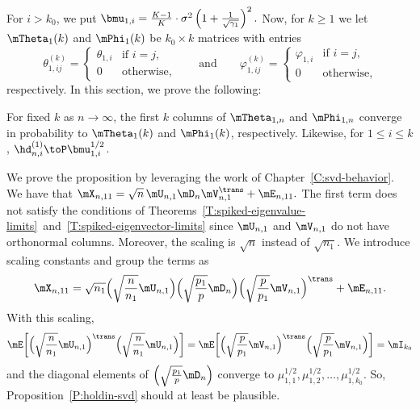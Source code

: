 For $i > k_0$, we put 
\(
    \bmu_{1,i} 
        =
            \frac{K-1}{K} 
            \cdot
            \sigma^2
            \left(
                1
                +
                \frac{1}{\sqrt{\gamma_1}}
            \right)^2.
\)
Now, for $k \geq 1$ we let $\mTheta_{1}(k)$ and $\mPhi_1(k)$ be $k_0 \times k$ matrices with entries
\[
    \theta_{1,ij}^{(k)}
        =
            \begin{cases}
                \theta_{1,i}&\text{if $i = j$,} \\
                0&\text{otherwise,}
            \end{cases}
    \qquad
    \text{and}
    \qquad
    \varphi_{1,ij}^{(k)}
        =
            \begin{cases}
                \varphi_{1,i}&\text{if $i = j$,} \\
                0&\text{otherwise,}
            \end{cases}
\]
respectively.  In this section, we prove the following:

\begin{proposition}\label{P:holdin-svd}
    For fixed $k$ as $n\to\infty$, the first $k$ columns of $\mTheta_{1,n}$
    and $\mPhi_{1,n}$ converge in probability to $\mTheta_{1}(k)$ and 
    $\mPhi_{1}(k)$, respectively.  Likewise, for $1 \leq i \leq k$,
    $\hd_{n,i}^{(1)} \toP \bmu_{1,i}^{1/2}$.
\end{proposition}

We prove the proposition by leveraging the work of 
Chapter~\ref{C:svd-behavior}.  We have that 
\(
    \mX_{n,11} = \sqrt{n} \, \mU_{n,1} \mD_n \mV_{n,1}^\trans + \mE_{n,11}.
\)
The first term does not satisfy the conditions of Theorems~\ref{T:spiked-eigenvalue-limits}~and~\ref{T:spiked-eigenvector-limits} since $\mU_{n,1}$ and $\mV_{n,1}$ do not have orthonormal columns.  Moreover, the scaling is $\sqrt{n}$ instead of $\sqrt{n_1}$.  We introduce scaling constants and group the terms as
\[
    \mX_{n,11}
        =
            \sqrt{n_1}
            \Big(
                \sqrt{\frac{n}{n_1}} \mU_{n,1}
            \Big)
            \Big(
                \sqrt{\frac{p_1}{p}} \mD_n
            \Big)
            \Big(
                \sqrt{\frac{p}{p_1}}
                \mV_{n,1}
            \Big)^\trans
            +
            \mE_{n,11}.
\]
With this scaling,
\[
    \mE \bigg[
        \Big( \sqrt{\frac{n}{n_1}} \mU_{n,1} \Big)^\trans
        \Big( \sqrt{\frac{n}{n_1}} \mU_{n,1} \Big)
    \bigg]
    =
    \mE \bigg[
        \Big( \sqrt{\frac{p}{p_1}} \mV_{n,1} \Big)^\trans
        \Big( \sqrt{\frac{p}{p_1}} \mV_{n,1} \Big)
    \bigg]
    =
    \mI_{k_0}
\]
and the diagonal elements of
\(
    \Big(
          \sqrt{\frac{p_1}{p}} \mD_n
    \Big)
\)
converge to 
\(
    \mu_{1,1}^{1/2},
    \mu_{1,2}^{1/2},
    \ldots,
    \mu_{1,k_0}^{1/2}.
\)
So, Proposition~\ref{P:holdin-svd} should at least be plausible.  

